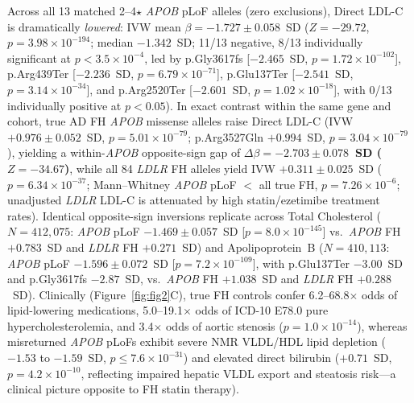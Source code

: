 \documentclass[11pt,letterpaper]{article}
\begin{document}
Across all 13 matched 2--4$\star$ \textit{APOB} pLoF alleles (zero exclusions), Direct LDL-C is dramatically \emph{lowered}: IVW mean $\beta = -1.727 \pm 0.058$~SD ($Z = -29.72$, $p = 3.98\times 10^{-194}$; median $-1.342$~SD; 11/13 negative, 8/13 individually significant at $p < 3.5\times 10^{-4}$, led by p.Gly3617fs [$-2.465$~SD, $p=1.72\times 10^{-102}$], p.Arg439Ter [$-2.236$~SD, $p=6.79\times 10^{-71}$], p.Glu137Ter [$-2.541$~SD, $p=3.14\times 10^{-34}$], and p.Arg2520Ter [$-2.601$~SD, $p=1.02\times 10^{-18}$], with 0/13 individually positive at $p<0.05$). In exact contrast within the same gene and cohort, true AD FH \textit{APOB} missense alleles raise Direct LDL-C (IVW $+0.976\pm 0.052$~SD, $p=5.01\times 10^{-79}$; p.Arg3527Gln $+0.994$~SD, $p=3.04\times 10^{-79}$), yielding a within-\textit{APOB} opposite-sign gap of \textbf{$\Delta\beta = -2.703\pm 0.078$~SD ($Z = -34.67$)}, while all 84 \textit{LDLR} FH alleles yield IVW $+0.311\pm 0.025$~SD ($p=6.34\times 10^{-37}$; Mann--Whitney \textit{APOB} pLoF $<$ all true FH, $p=7.26\times 10^{-6}$; unadjusted \textit{LDLR} LDL-C is attenuated by high statin/ezetimibe treatment rates). Identical opposite-sign inversions replicate across Total Cholesterol ($N=412{,}075$: \textit{APOB} pLoF $-1.469\pm 0.057$~SD [$p=8.0\times 10^{-145}$] vs.\ \textit{APOB} FH $+0.783$~SD and \textit{LDLR} FH $+0.271$~SD) and Apolipoprotein~B ($N=410{,}113$: \textit{APOB} pLoF $-1.596\pm 0.072$~SD [$p=7.2\times 10^{-109}$], with p.Glu137Ter $-3.00$~SD and p.Gly3617fs $-2.87$~SD, vs.\ \textit{APOB} FH $+1.038$~SD and \textit{LDLR} FH $+0.288$~SD). Clinically (Figure~\ref{fig:fig2}C), true FH controls confer 6.2--68.8$\times$ odds of lipid-lowering medications, 5.0--19.1$\times$ odds of ICD-10 E78.0 pure hypercholesterolemia, and 3.4$\times$ odds of aortic stenosis ($p=1.0\times 10^{-14}$), whereas misreturned \textit{APOB} pLoFs exhibit severe NMR VLDL/HDL lipid depletion ($-1.53$ to $-1.59$~SD, $p\le 7.6\times 10^{-31}$) and elevated direct bilirubin ($+0.71$~SD, $p=4.2\times 10^{-10}$, reflecting impaired hepatic VLDL export and steatosis risk---a clinical picture opposite to FH statin therapy).
\end{document}

